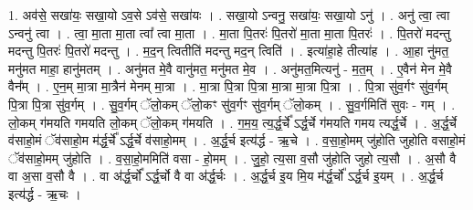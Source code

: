 \documentclass[17pt]{extarticle}
\begin{document}
1. अव॑से॒ सखा॑यः॒ सखा॒यो ऽव॒से ऽव॑से॒ सखा॑यः । . सखा॒यो ऽन्वनु॒ सखा॑यः॒ सखा॒यो ऽनु॑ । . अनु॑ त्वा॒ त्वा ऽन्वनु॑ त्वा । . त्वा॒ मा॒ता मा॒ता त्वा᳚ त्वा मा॒ता । . मा॒ता पि॒तरः॑ पि॒तरो॑ मा॒ता मा॒ता पि॒तरः॑ । . पि॒तरो॑ मदन्तु मदन्तु पि॒तरः॑ पि॒तरो॑ मदन्तु । . म॒द॒न् त्वितीति॑ मदन्तु मद॒न् त्विति॑ । . इत्या॑हा॒हे तीत्या॑ह । . आ॒हा नु॑मत॒ मनु॑मत माहा॒ हानु॑मतम् । . अनु॑मत मे॒वै वानु॑मत॒ मनु॑मत मे॒व । . अनु॑मत॒मित्यनु॑ - म॒त॒म् । . ए॒वैन॑ मेन मे॒वै वैन᳚म् । . ए॒न॒म् मा॒त्रा मा॒त्रैन॑ मेनम् मा॒त्रा । . मा॒त्रा पि॒त्रा पि॒त्रा मा॒त्रा मा॒त्रा पि॒त्रा । . पि॒त्रा सु॑व॒र्गꣳ सु॑व॒र्गम् पि॒त्रा पि॒त्रा सु॑व॒र्गम् । . सु॒व॒र्गम् ॅलो॒कम् ॅलो॒कꣳ सु॑व॒र्गꣳ सु॑व॒र्गम् ॅलो॒कम् । . सु॒व॒र्गमिति॑ सुवः - गम् । . लो॒कम् ग॑मयति गमयति लो॒कम् ॅलो॒कम् ग॑मयति । . ग॒म॒य॒ त्य॒र्द्ध॒र्चे᳚ ऽर्द्ध॒र्चे ग॑मयति गमय त्यर्द्ध॒र्चे । . अ॒र्द्ध॒र्चे व॑साहो॒मं ॅव॑साहो॒म म॑र्द्ध॒र्चे᳚ ऽर्द्ध॒र्चे व॑साहो॒मम् । . अ॒र्द्ध॒र्च इत्य॑र्द्ध - ऋ॒चे । . व॒सा॒हो॒मम् जु॑होति जुहोति वसाहो॒मं ॅव॑साहो॒मम् जु॑होति । . व॒सा॒हो॒ममिति॑ वसा - हो॒मम् । . जु॒हो॒ त्य॒सा व॒सौ जु॑होति जुहो त्य॒सौ । . अ॒सौ वै वा अ॒सा व॒सौ वै । . वा अ॑र्द्ध॒र्चो᳚ ऽर्द्ध॒र्चो वै वा अ॑र्द्ध॒र्चः । . अ॒र्द्ध॒र्च इ॒य मि॒य म॑र्द्ध॒र्चो᳚ ऽर्द्ध॒र्च इ॒यम् । . अ॒र्द्ध॒र्च इत्य॑र्द्ध - ऋ॒चः । \newline
\end{document}
